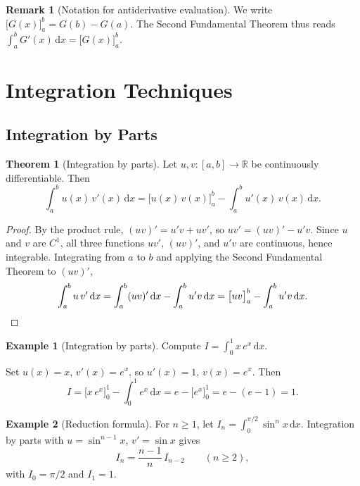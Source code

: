 \documentclass[12pt,a4paper]{book}
\theoremstyle{definition}
\newtheorem{theorem}{Theorem}[chapter]
\newtheorem{remark}{Remark}[chapter]
\newtheorem{example}{Example}[chapter]
\newcommand{\R}{\mathbb{R}}
\newcommand{\dd}{\,\mathrm{d}}
\begin{document}
\begin{remark}[Notation for antiderivative evaluation]\label{rem:antideriv-notation}
  We write $\bigl[G(x)\bigr]_a^b = G(b)-G(a)$.  The Second Fundamental
  Theorem thus reads
  $\displaystyle\int_a^b G'(x)\dd x = \bigl[G(x)\bigr]_a^b$.
\end{remark}



\section{Integration Techniques}\label{sec:integration-techniques}

\subsection{Integration by Parts}\label{subsec:int-by-parts}

\begin{theorem}[Integration by parts]\label{thm:int-by-parts}
  Let $u,v\colon[a,b]\to\R$ be continuously differentiable.  Then
  \[
    \int_a^b u(x)\,v'(x)\dd x
    = \bigl[u(x)\,v(x)\bigr]_a^b - \int_a^b u'(x)\,v(x)\dd x.
  \]
\end{theorem}

\begin{proof}
  By the product rule, $(uv)'=u'v+uv'$, so $uv'=(uv)'-u'v$.
  Since $u$ and $v$ are $C^1$, all three functions $uv'$, $(uv)'$, and
  $u'v$ are continuous, hence integrable.  Integrating from $a$ to $b$
  and applying the Second Fundamental Theorem to $(uv)'$,
  \[
    \int_a^b u\,v'\dd x
    = \int_a^b (uv)'\dd x - \int_a^b u'v\dd x
    = \bigl[uv\bigr]_a^b - \int_a^b u'v\dd x. \qedhere
  \]
\end{proof}

\begin{example}[Integration by parts]\label{ex:ibp-example1}
  Compute $\displaystyle I=\int_0^1 x\,e^x\dd x$.

  Set $u(x)=x$, $v'(x)=e^x$, so $u'(x)=1$, $v(x)=e^x$.  Then
  \[
    I = \bigl[x\,e^x\bigr]_0^1 - \int_0^1 e^x\dd x
    = e - \bigl[e^x\bigr]_0^1
    = e-(e-1) = 1.
  \]
\end{example}

\begin{example}[Reduction formula]\label{ex:ibp-reduction}
  For $n\ge1$, let $I_n=\int_0^{\pi/2}\sin^n x\dd x$.  Integration by
  parts with $u=\sin^{n-1}x$, $v'=\sin x$ gives
  \[
    I_n = \frac{n-1}{n}\,I_{n-2} \qquad(n\ge2),
  \]
  with $I_0=\pi/2$ and $I_1=1$.
\end{example}
\end{document}
